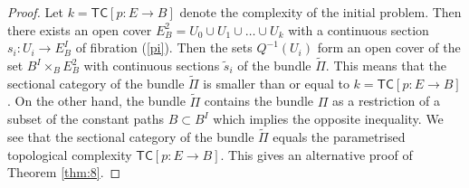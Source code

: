 \documentclass[11pt]{amsart}
\def\tc{{\mathsf{TC}}}
\begin{document}
{\begin{proof}
Let $k=\tc[p:E\to B]$ denote the complexity of the initial problem. Then there exists an open cover 
$E^2_B =U_0\cup U_1\cup\dots \cup U_k$ with a continuous section $s_i:U_i\to E^I_B$ of fibration (\ref{pi}). 
Then the sets $Q^{-1}(U_i)$ form an open cover of the set 
$B^I\times_B E^2_B$ with continuous sections $\tilde s_i$ of the bundle $\tilde \Pi$. This means that the sectional category of the bundle 
$\tilde \Pi$ is smaller than or equal to $k=\tc[p:E\to B]$. On the other hand, the bundle $\tilde \Pi$ contains the bundle $\Pi$ as a restriction of a subset of the constant paths $B\subset B^I$ which implies the opposite inequality. 
We see that the sectional category of the bundle $\tilde \Pi$ equals 
the parametrised topological complexity $\tc[p:E\to B]$. This gives an alternative proof of Theorem \ref{thm:8}. 
\end{proof}

}
\end{document}
